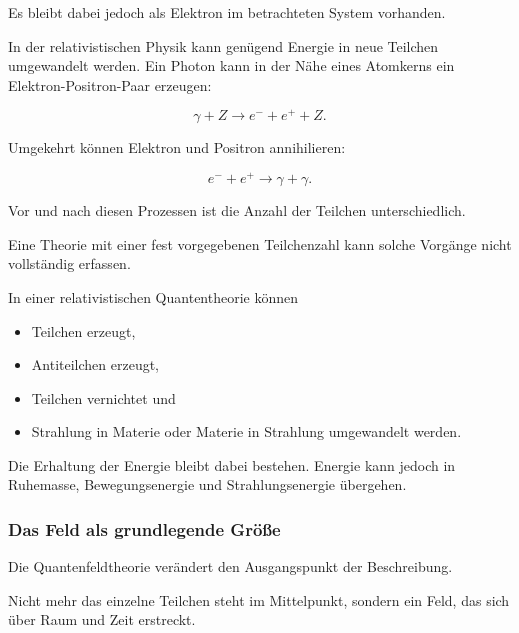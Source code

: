 Es bleibt dabei jedoch als Elektron im betrachteten System vorhanden.

In der relativistischen Physik kann genügend Energie in neue Teilchen
umgewandelt werden. Ein Photon kann in der Nähe eines Atomkerns ein
Elektron-Positron-Paar erzeugen:

\begin{equation}
	\gamma
	+
	Z
	\longrightarrow
	e^-
	+
	e^+
	+
	Z.
	\label{eq:paarbildung_uebergang_feldtheorie}
\end{equation}

Umgekehrt können Elektron und Positron annihilieren:

\begin{equation}
	e^-
	+
	e^+
	\longrightarrow
	\gamma
	+
	\gamma.
	\label{eq:annihilation_uebergang_feldtheorie}
\end{equation}

Vor und nach diesen Prozessen ist die Anzahl der Teilchen
unterschiedlich.

Eine Theorie mit einer fest vorgegebenen Teilchenzahl kann solche
Vorgänge nicht vollständig erfassen.

\begin{PhysicsBox}
	\label{box:veraenderliche_teilchenzahl}
	
	In einer relativistischen Quantentheorie können
	
	\begin{itemize}
		\item Teilchen erzeugt,
		\item Antiteilchen erzeugt,
		\item Teilchen vernichtet und
		\item Strahlung in Materie oder Materie in Strahlung umgewandelt
		werden.
	\end{itemize}
	
	Die Erhaltung der Energie bleibt dabei bestehen. Energie kann jedoch
	in Ruhemasse, Bewegungsenergie und Strahlungsenergie übergehen.
\end{PhysicsBox}

\subsubsection*{Das Feld als grundlegende Größe}

Die Quantenfeldtheorie verändert den Ausgangspunkt der Beschreibung.

Nicht mehr das einzelne Teilchen steht im Mittelpunkt, sondern ein
Feld, das sich über Raum und Zeit
erstreckt.

